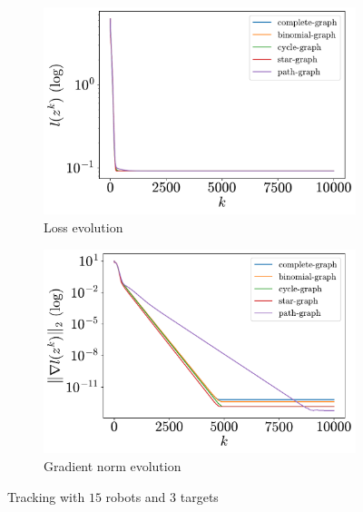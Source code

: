 \documentclass[a4paper,11pt,oneside]{book}
\begin{document}
\begin{figure}[H]
      \centering
      \begin{subfigure}[t]{0.46\linewidth}
            \centering
            \includegraphics[width=\linewidth]{./figs/tracking/15_3_2/loss.pdf} 
            \caption{Loss evolution}
      \end{subfigure}
      \hfill
      \begin{subfigure}[t]{0.46\linewidth}
            \centering
            \includegraphics[width=\linewidth]{./figs/tracking/15_3_2/gradient.pdf} 
            \caption{Gradient norm evolution}
      \end{subfigure}
      \caption{Tracking with $15$ robots and $3$ targets}
      \label{fig:tracking_15_3}
\end{figure}
\end{document}
